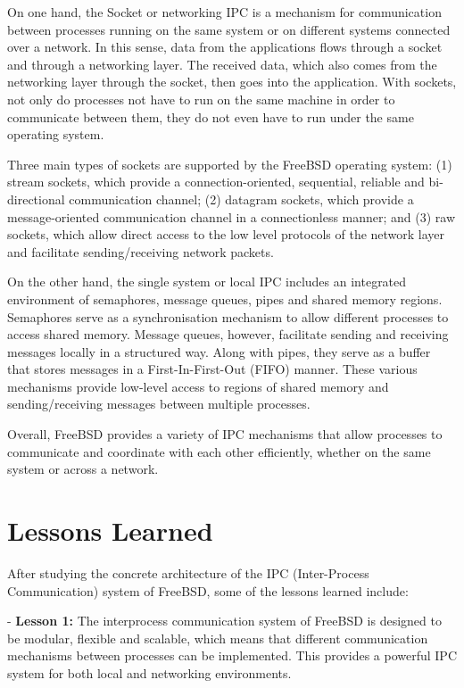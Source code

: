 \documentclass[12pt, dvipsnames, a4paper]{article}
\begin{document}
On one hand, the Socket or networking IPC is a mechanism for communication between processes running on the same system or on different systems connected over a network. In this sense, data from the applications flows through a socket and through a networking layer. The received data, which also comes from the networking layer through the socket, then goes into the application. With sockets, not only do processes not have to run on the same machine in order to communicate between them, they do not even have to run under the same operating system.

Three main types of sockets are supported by the FreeBSD operating system: (1) stream sockets, which provide a connection-oriented, sequential, reliable and bi-directional communication channel; (2) datagram sockets, which provide a message-oriented communication channel in a connectionless manner; and (3) raw sockets, which allow direct access to the low level protocols of the network layer and facilitate sending/receiving network packets.

On the other hand, the single system or local IPC includes an integrated environment of semaphores, message queues, pipes and shared memory regions. Semaphores serve as a synchronisation mechanism to allow different processes to access shared memory. Message queues, however, facilitate sending and receiving messages locally in a structured way. Along with pipes, they serve as a buffer that stores messages in a First-In-First-Out (FIFO) manner. These various mechanisms provide low-level access to regions of shared memory and sending/receiving messages between multiple processes. 

Overall, FreeBSD provides a variety of IPC mechanisms that allow processes to communicate and coordinate with each other efficiently, whether on the same system or across a network.

\section{Lessons Learned}
After studying the concrete architecture of the IPC (Inter-Process Communication) system of FreeBSD, some of the lessons learned include:

- \textbf{Lesson 1:} The interprocess communication system of FreeBSD is designed to be modular, flexible and scalable, which means that different communication mechanisms between processes can be implemented. This provides a powerful IPC system  for both local and networking environments.
\end{document}
